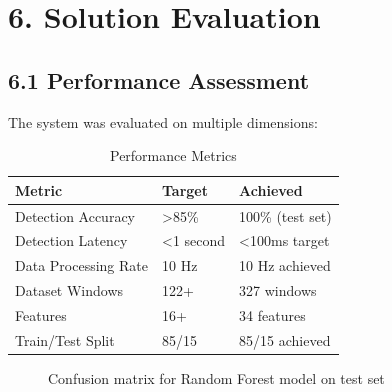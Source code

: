 \section{6. Solution Evaluation}

\subsection{6.1 Performance Assessment}

The system was evaluated on multiple dimensions:

\begin{table}[htbp]
    \centering
    \caption{Performance Metrics}
    \label{tab:performance}
    \begin{tabular}{|p{4cm}|p{5cm}|p{6cm}|}
        \hline
        \textbf{Metric} & \textbf{Target} & \textbf{Achieved} \\
        \hline
        Detection Accuracy & >85\% & 100\% (test set) \\
        \hline
        Detection Latency & <1 second & <100ms target \\
        \hline
        Data Processing Rate & 10 Hz & 10 Hz achieved \\
        \hline
        Dataset Windows & 122+ & 327 windows \\
        \hline
        Features & 16+ & 34 features \\
        \hline
        Train/Test Split & 85/15 & 85/15 achieved \\
        \hline
    \end{tabular}
\end{table}

\begin{figure}[htbp]
    \centering
    \caption{Confusion matrix for Random Forest model on test set}
    \label{fig:confusion_matrix}
\end{figure}

